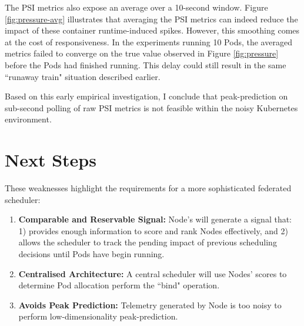The PSI metrics also expose an average over a 10-second window. Figure
\ref{fig:pressure-avg} illustrates that averaging the PSI metrics can indeed
reduce the impact of these container runtime-induced spikes. However, this
smoothing comes at the cost of responsiveness. In the experiments running 10
Pods, the averaged metrics failed to converge on the true value observed in
Figure \ref{fig:pressure} before the Pods had finished running. This delay could
still result in the same ``runaway train" situation described earlier.

Based on this early empirical investigation, I conclude that peak-prediction on
sub-second polling of raw PSI metrics is not feasible within the noisy
Kubernetes environment.

\section{Next Steps}
These weaknesses highlight the requirements for a more sophisticated federated
scheduler:
\begin{enumerate}
    \item \textbf{Comparable and Reservable Signal:} Node's will generate a
        signal that: 1) provides enough information to score and rank
        Nodes effectively, and 2) allows the scheduler to track the pending impact
        of previous scheduling decisions until Pods have begin running.
    \item \textbf{Centralised Architecture:} A central scheduler will use
        Nodes' scores to determine Pod allocation perform the ``bind" operation.
    \item \textbf{Avoids Peak Prediction:} Telemetry generated by Node is too
        noisy to perform low-dimensionality peak-prediction.
\end{enumerate}




%
%
%

